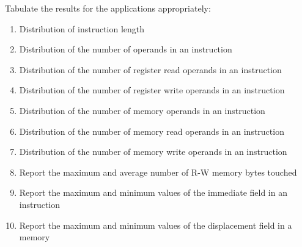 \begin{Problem}
    Tabulate the results for the applications appropriately:
    \begin{enumerate}[label=\arabic*., itemsep=0.4pt]
        \item Distribution of instruction length
        \item Distribution of the number of operands in an instruction
        \item Distribution of the number of register read operands in an instruction
        \item Distribution of the number of register write operands in an instruction
        \item Distribution of the number of memory operands in an instruction
        \item Distribution of the number of memory read operands in an instruction
        \item Distribution of the number of memory write operands in an instruction
        \item Report the maximum and average number of R-W memory bytes touched
        \item Report the maximum and minimum values of the immediate field in an instruction
        \item Report the maximum and minimum values of the displacement field in a memory
    \end{enumerate}
\end{Problem}

